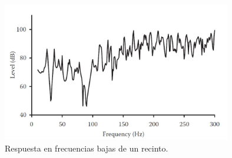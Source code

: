 \begin{figure}[H]
    \centering
    \includegraphics[width=10cm]{Imagenes/MarcoTeorico/respuesta_frecuencias.jpg}
    \caption{Respuesta en frecuencias bajas de un recinto.}
    \label{fig: respuesta frecuencia}
\end{figure}

